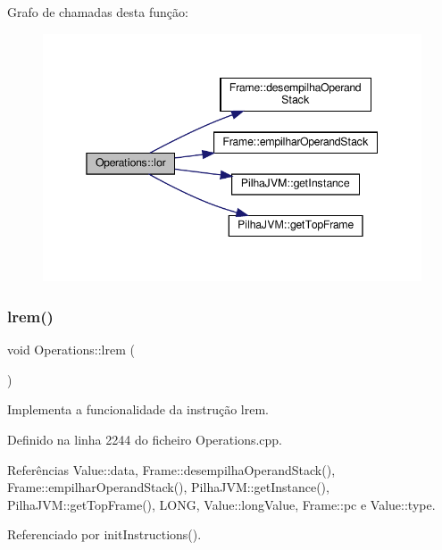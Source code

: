 Grafo de chamadas desta função\+:
\nopagebreak
\begin{figure}[H]
\begin{center}
\leavevmode
\includegraphics[width=345pt]{classOperations_a89193dfaaa2c4c45f320c6b9f0b5601c_cgraph}
\end{center}
\end{figure}
\mbox{\label{classOperations_a437e4b34f2f1be8982d36f0cdf47f98c}} 
\subsubsection{\texorpdfstring{lrem()}{lrem()}}
{\footnotesize\ttfamily void Operations\+::lrem (\begin{DoxyParamCaption}{ }\end{DoxyParamCaption})\hspace{0.3cm}{\ttfamily [private]}}



Implementa a funcionalidade da instrução lrem. 



Definido na linha 2244 do ficheiro Operations.\+cpp.



Referências Value\+::data, Frame\+::desempilha\+Operand\+Stack(), Frame\+::empilhar\+Operand\+Stack(), Pilha\+J\+V\+M\+::get\+Instance(), Pilha\+J\+V\+M\+::get\+Top\+Frame(), L\+O\+NG, Value\+::long\+Value, Frame\+::pc e Value\+::type.



Referenciado por init\+Instructions().

